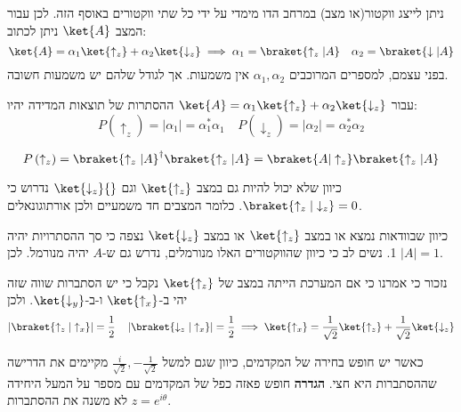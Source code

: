 \documentclass{tstextbook}
\begin{document}
ניתן לייצג ווקטור(או מצב) במרחב הדו מימדי על ידי כל שתי ווקטורים באוסף הזה. לכן עבור המצב \(\ket{A}\) ניתן לכתוב:
$$\ket{A} = \alpha_{1}\ket{\uparrow_{z}} +\alpha_{2}\ket{\downarrow_{z}} \implies \alpha_{1}=\braket{  \uparrow_{z}|  A}\quad \alpha_{2}=\braket{ \downarrow | A }    $$
בפני עצמם, למספרים המרוכבים \(\alpha_{1},\alpha_{2}\) אין משמעות. אך לגודל שלהם יש משמעות חשובה.

\begin{proposition}
עבור \(\ket{A} = \alpha_{1}\ket{\uparrow_{z}} +\alpha_{2}\ket{\downarrow_{z}}\) ההסתרות של תוצאות המדידה יהיו:
$$P\left( \uparrow_{z} \right)=\left\lvert  \alpha_{1}  \right\rvert =\alpha_{1}^*\alpha_{1}^\qquad P\left( \downarrow_{z} \right)=\left\lvert  \alpha_{2}  \right\rvert =\alpha_{2}^{*}\alpha_{2}$$

\end{proposition}
\begin{corollary}
$$P\left( \uparrow_{z} \right)=\braket{ \uparrow_{z} | A }^{\dagger} \braket{ \uparrow_{z} | A }  =\braket{ A | \uparrow_{z} } \braket{ \uparrow_{z} | A } $$

\end{corollary}
\begin{proposition}
כיוון שלא יכול להיות גם במצב \(\ket{\uparrow_{z}}\) וגם \({} \ket{\downarrow_{z}} {}\) נדרוש כי \(\braket{ \uparrow_{z} | \downarrow_{z} }=0\). כלומר המצבים חד משמעיים ולכן אורתוגונאלים.

\end{proposition}
\begin{proposition}
כיוון שבוודאות נמצא או במצב \(\ket{\uparrow_{z}}\) או במצב \(\ket{\downarrow_{z}}\) נצפה כי סך ההסתרויות יהיה 1. נשים לב כי כיוון שהווקטורים האלו מנורמלים, נדרש גם ש-\(A\) יהיה מנורמל. לכן \(\lvert A \rvert=1\).

\end{proposition}
נזכור כי אמרנו כי אם המערכת הייתה במצב של \(\ket{\uparrow_{z}}\) נקבל כי יש הסתברות שווה שזה יהי ב-\(\ket{\uparrow_{x}}\) ו-ב-\(\ket{\downarrow_{y}}\). ולכן
$$\left\lvert  \braket{ \uparrow_{z} | \uparrow_{x} }  \right\rvert  =\frac{1}{2}\quad \left\lvert  \braket{ \downarrow_{z} | \uparrow_{x} }\right\rvert = \frac{1}{2}\implies    \ket{\uparrow_{x}} = \frac{1}{\sqrt{ 2 }}\ket{\uparrow_{z}} +\frac{1}{\sqrt{ 2 }}\ket{\downarrow_{z}} $$

כאשר יש חופש בחירה של המקדמים, כיוון שגם למשל \(\frac{i}{\sqrt{ 2 }},-\frac{1}{\sqrt{ 2 }}\) מקיימים את הדרישה שההסתברות היא חצי.
\textbf{הגדרה} חופש פאזה
כפל של המקדמים עם מספר על המעל היחידה \(z = e^{i\theta}\) לא משנה את ההסתברות.
\end{document}
